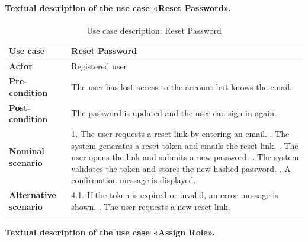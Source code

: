 \paragraph{Textual description of the use case «Reset Password».}

\begin{table}[H]
\centering
\caption{Use case description: Reset Password}
\label{tab:uc_reset}
\renewcommand{\arraystretch}{1.3}
\begin{tabularx}{\textwidth}{|L{3.2cm}|X|}
\hline
\textbf{Use case} & Reset Password \\
\hline
\textbf{Actor} & Registered user \\
\hline
\textbf{Pre-condition} & The user has lost access to the account but knows the email. \\
\hline
\textbf{Post-condition} & The password is updated and the user can sign in again. \\
\hline
\textbf{Nominal scenario} &
1. The user requests a reset link by entering an email. . The system generates a reset token and emails the reset link. . The user opens the link and submits a new password. . The system validates the token and stores the new hashed password. . A confirmation message is displayed. \\
\hline
\textbf{Alternative scenario} &
4.1. If the token is expired or invalid, an error message is shown. . The user requests a new reset link.
\\
\hline
\end{tabularx}
\end{table}

\paragraph{Textual description of the use case «Assign Role».}

